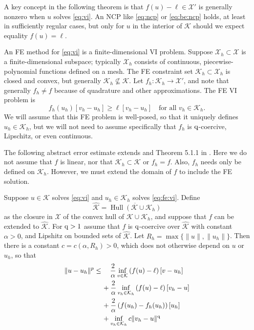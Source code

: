 \documentclass[hidelinks,onefignum,onetabnum,final]{siamart220329}  %
\newcommand{\cK}{\mathcal{K}}
\newcommand{\cX}{\mathcal{X}}
\newcommand{\hcK}{\widehat{\cK}}
\newcommand{\qq}{{\text{\textnormal{q}}}}
\DeclareMathOperator*{\Hull}{Hull}
\begin{document}
A key concept in the following theorem is that $f(u)-\ell \in \cX'$ is generally nonzero when $u$ solves \eqref{eq:vi}.  An NCP like \eqref{eq:ncp} or \eqref{eq:be:ncp} holds, at least in sufficiently regular cases, but only for $u$ in the interior of $\cK$ should we expect equality $f(u)=\ell$.

An FE method for \eqref{eq:vi} is a finite-dimensional VI problem.  Suppose $\cX_h \subset \cX$ is a finite-dimensional subspace; typically $\cX_h$ consists of continuous, piecewise-polynomial functions defined on a mesh.  The FE constraint set $\cK_h\subset \cX_h$ is closed and convex, but generally $\cK_h \nsubseteq \cK$.  Let $f_h:\cK_h\to\cX'$, and note that generally $f_h\ne f$ because of quadrature and other approximations.  The FE VI problem is
\begin{equation}
f_h(u_h)[v_h-u_h] \ge \ell[v_h-u_h] \quad \text{for all } v_h\in \cK_h. \label{eq:fe:vi}
\end{equation}
We will assume that this FE problem is well-posed, so that it uniquely defines $u_h\in\cK_h$, but we will not need to assume specifically that $f_h$ is $\qq$-coercive, Lipschitz, or even continuous.

The following abstract error estimate extends \cite{Falk1974} and Theorem 5.1.1 in \cite{Ciarlet2002}.  Here we do not assume that $f$ is linear, nor that $\cK_h \subset \cK$ or $f_h=f$.  Also, $f_h$ needs only be defined on $\cK_h$.  However, we must extend the domain of $f$ to include the FE solution.

\begin{theorem} \label{thm:abstractestimate}  Suppose $u\in\cK$ solves \eqref{eq:vi} and $u_h\in\cK_h$ solves \eqref{eq:fe:vi}.  Define
\begin{equation}
\hcK = \overline{\Hull{(\cK \cup \cK_h)}}  \label{eq:convexhull}
\end{equation}
as the closure in $\cX$ of the convex hull of $\cK \cup \cK_h$, and suppose that $f$ can be extended to $\hcK$.  For $\qq>1$ assume that $f$ is $\qq$-coercive over $\hcK$ with constant $\alpha>0$, and Lipshitz on bounded sets of $\hcK$.  Let $R_h=\max\{\|u\|,\|u_h\|\}$.  Then there is a constant $c=c(\alpha,R_h)>0$, which does not otherwise depend on $u$ or $u_h$, so that
\begin{align}
\|u-u_h\|^p &\le \quad \frac{2}{\alpha} \inf_{v\in\cK} \left(f(u)-\ell\right)[v-u_h] \label{eq:abstractestimate} \\
   &\quad\, + \frac{2}{\alpha} \inf_{v_h\in\cK_h} \left(f(u)-\ell\right)[v_h-u] \notag \\
   &\quad\, + \frac{2}{\alpha} \left(f(u_h)-f_h(u_h)\right)[u_h] \notag \\
   &\quad\, + \inf_{v_h\in\cK_h} c \|v_h - u\|^\qq \notag
\end{align}
\end{theorem}
\end{document}
